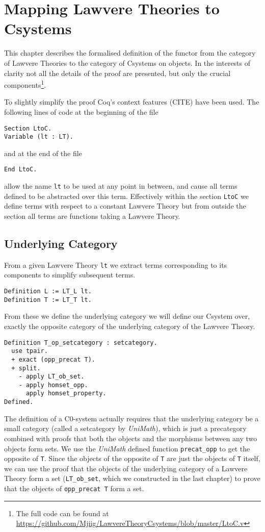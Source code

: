 \chapter{Mapping Lawvere Theories to Csystems}
This chapter describes the formalised definition of the functor from the
category of Lawvere Theories to the category of Csystems on objects. In the
interests of clarity not all the details of the proof are presented, but only
the crucial components\footnote{The full code can be found at
\url{https://github.com/Mjiig/LawvereTheoryCsystems/blob/master/LtoC.v}}.

To slightly simplify the proof Coq's context features (CITE) have been used. The
following lines of code at the beginning of the file
\begin{lstlisting}
Section LtoC.
Variable (lt : LT).
\end{lstlisting}
and at the end of the file
\begin{lstlisting}
End LtoC.
\end{lstlisting}
allow the name \lstinline|lt| to be used at any point in between, and cause all terms
defined to be abstracted over this term. Effectively within the section
\lstinline|LtoC| we define terms with respect to a constant Lawvere Theory but from
outside the section all terms are functions taking a Lawvere Theory.

\section{Underlying Category}
From a given Lawvere Theory \lstinline|lt| we extract terms corresponding to its
components to simplify subsequent terms.
\begin{lstlisting}
Definition L := LT_L lt.
Definition T := LT_T lt.
\end{lstlisting}

From these we define the underlying category we will define our Csystem over,
exactly the opposite category of the underlying category of the Lawvere Theory.
\begin{lstlisting}
Definition T_op_setcategory : setcategory.
  use tpair.
  + exact (opp_precat T).
  + split.
    - apply LT_ob_set.
    - apply homset_opp.
      apply homset_property.
Defined.
\end{lstlisting}
The definition of a C0-system actually requires that the underlying category be
a small category (called a setcategory by \textit{UniMath}), which is just a
precategory combined with proofs that both the objects and the morphisms between
any two objects form sets. We use the \textit{UniMath} defined function
\lstinline|precat_opp| to get the opposite of \lstinline|T|. Since the objects of the
opposite of \lstinline|T| are just the objects of \lstinline|T| itself, we can use the
proof that the objects of the underlying category of a Lawvere Theory form a set
(\lstinline|LT_ob_set|, which we constructed in the last chapter) to prove that the
objects of \lstinline|opp_precat T| form a set. 

